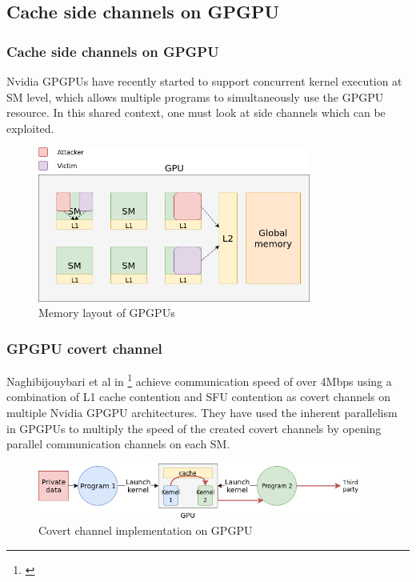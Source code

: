 \documentclass[10pt]{beamer}
\begin{document}
\subsection{Cache side channels on GPGPU}
\begin{frame}
\frametitle{Cache side channels on GPGPU}
Nvidia GPGPUs have recently started to support concurrent kernel execution at SM level, which allows multiple
programs to simultaneously use the GPGPU resource. In this shared context, one must
look at side channels which can be exploited.

\begin{figure}
    \centering
    \includegraphics[width=0.8\textwidth]{figures/gpgpu}
    \caption{Memory layout of GPGPUs}
\end{figure}
\end{frame}

\begin{frame}
\frametitle{GPGPU covert channel}
    Naghibijouybari et al in \footnote{\cite{naghi}} achieve communication speed of over 4Mbps
    using a combination of L1 cache contention and SFU contention as covert channels on multiple Nvidia
    GPGPU architectures. They have used the inherent parallelism in GPGPUs to multiply
    the speed of the created covert channels by opening parallel communication channels on
    each SM.
\begin{figure}
    \centering
    \includegraphics[width=0.95\textwidth]{figures/covert_channel}
    \caption{Covert channel implementation on GPGPU}
\end{figure}
\end{frame}
\end{document}
